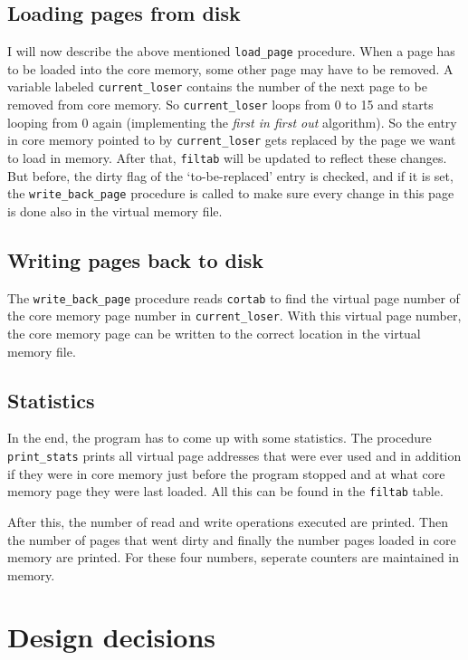 \documentclass[11pt]{article}
\begin{document}
\subsection{Loading pages from disk}

I will now describe the above mentioned \verb|load_page| procedure. When a page has to be loaded into the core memory, some other page may have to be removed. A variable labeled \verb|current_loser| contains the number of the next page to be removed from core memory. So \verb|current_loser| loops from 0 to 15 and starts looping from 0 again (implementing the \emph{first in first out} algorithm). So the entry in core memory pointed to by \verb|current_loser| gets replaced by the page we want to load in memory. After that, \verb|filtab| will be updated to reflect these changes. But before, the dirty flag of the `to-be-replaced' entry is checked, and if it is set, the \verb|write_back_page| procedure is called to make sure every change in this page is done also in the virtual memory file.

\subsection{Writing pages back to disk}

The \verb|write_back_page| procedure reads \verb|cortab| to find the virtual page number of the core memory page number in \verb|current_loser|. With this virtual page number, the core memory page can be written to the correct location in the virtual memory file.

\subsection{Statistics}

In the end, the program has to come up with some statistics. The procedure \verb|print_stats| prints all virtual page addresses that were ever used and in addition if they were in core memory just before the program stopped and at what core memory page they were last loaded. All this can be found in the \verb|filtab| table.

After this, the number of read and write operations executed are printed. Then the number of pages that went dirty and finally the number pages loaded in core memory are printed. For these four numbers, seperate counters are maintained in memory.


\section{Design decisions}
\end{document}
